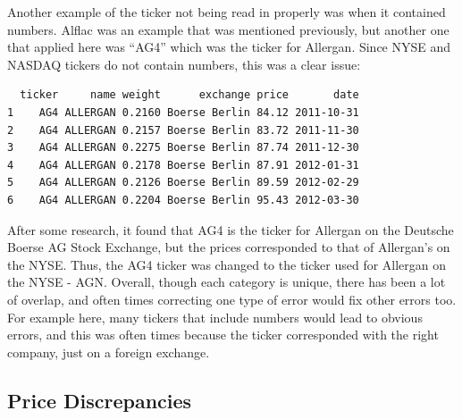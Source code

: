 \documentclass[12pt,twoside]{reedthesis}
\theoremstyle{definition}
\theoremstyle{definition}
\theoremstyle{definition}
\theoremstyle{remark}
\begin{document}
Another example of the ticker not being read in properly was when it
contained numbers. Alflac was an example that was mentioned previously,
but another one that applied here was ``AG4'' which was the ticker for
Allergan. Since NYSE and NASDAQ tickers do not contain numbers, this was
a clear issue:
\begin{verbatim}
  ticker     name weight      exchange price       date
1    AG4 ALLERGAN 0.2160 Boerse Berlin 84.12 2011-10-31
2    AG4 ALLERGAN 0.2157 Boerse Berlin 83.72 2011-11-30
3    AG4 ALLERGAN 0.2275 Boerse Berlin 87.74 2011-12-30
4    AG4 ALLERGAN 0.2178 Boerse Berlin 87.91 2012-01-31
5    AG4 ALLERGAN 0.2126 Boerse Berlin 89.59 2012-02-29
6    AG4 ALLERGAN 0.2204 Boerse Berlin 95.43 2012-03-30
\end{verbatim}
After some research, it found that AG4 is the ticker for Allergan on the
Deutsche Boerse AG Stock Exchange, but the prices corresponded to that
of Allergan's on the NYSE. Thus, the AG4 ticker was changed to the
ticker used for Allergan on the NYSE - AGN. Overall, though each
category is unique, there has been a lot of overlap, and often times
correcting one type of error would fix other errors too. For example
here, many tickers that include numbers would lead to obvious errors,
and this was often times because the ticker corresponded with the right
company, just on a foreign exchange.

\subsection{Price Discrepancies}\label{price-discrepancies}
\end{document}
